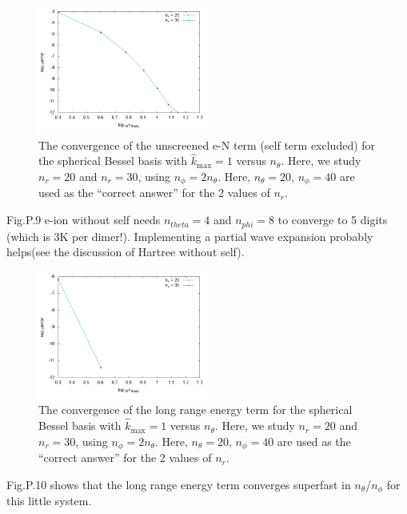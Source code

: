 \documentclass[paper=a4, fontsize=11pt]{article} %
\numberwithin{equation}{section} %
\numberwithin{figure}{section} %
\numberwithin{table}{section} %
\begin{document}
\begin{figure}[h!] 
    \centering
    \includegraphics[width=0.5\textwidth]{nthetaeNnoself}
    \caption{The convergence of the unscreened e-N term (self term excluded) for the spherical Bessel basis with $\hat {k}_{\mathrm{max}} = 1$ versus $n_{\theta}$. Here, we study $n_r = 20$ and $n_r = 30$, using $n_{\phi} = 2n_{\theta}$. Here, $n_{\theta} = 20$, $n_{\phi} = 40$ are used as the ``correct answer'' for the 2 values of $n_r$.} 
    \label{fig:nthetaeNnoself}
\end{figure}

Fig.P.9 e-ion without self needs $n_{theta} = 4$ and $n_{phi} = 8$ to converge to 5 digits (which is 3K per dimer!). Implementing a partial wave expansion probably helps(see the discussion of Hartree without self).

\begin{figure}[h!] 
    \centering
    \includegraphics[width=0.5\textwidth]{nthetaElong}
    \caption{The convergence of the long range energy term for the spherical Bessel basis with $\hat {k}_{\mathrm{max}} = 1$ versus $n_{\theta}$. Here, we study $n_r = 20$ and $n_r = 30$, using $n_{\phi} = 2n_{\theta}$. Here, $n_{\theta} = 20$, $n_{\phi} = 40$ are used as the ``correct answer'' for the 2 values of $n_r$.} 
    \label{fig:nthetaElong}
\end{figure}

Fig.P.10 shows that the long range energy term converges superfast in $n_{\theta}$/$n_{\phi}$ for this little system.
\end{document}
